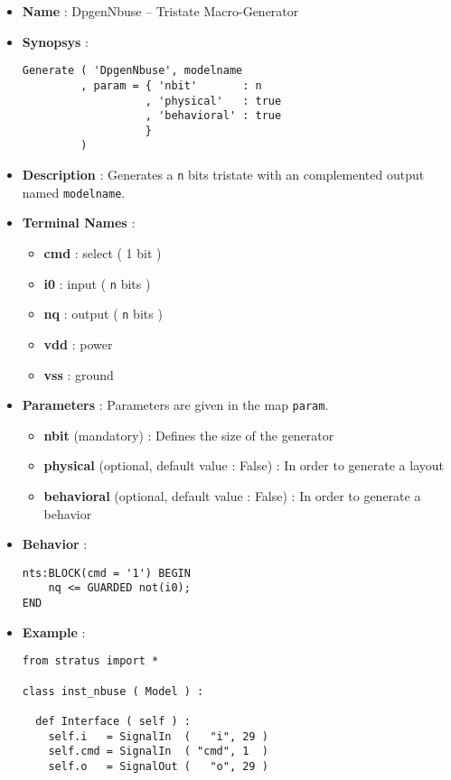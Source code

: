 \begin{itemize}
    \item \textbf{Name} : DpgenNbuse -- Tristate Macro-Generator
    \item \textbf{Synopsys} :
\begin{verbatim}
Generate ( 'DpgenNbuse', modelname
         , param = { 'nbit'       : n
                   , 'physical'   : true
                   , 'behavioral' : true         
                   }
         )
\end{verbatim}
    \item \textbf{Description} : Generates a \verb-n- bits tristate with an complemented output named \verb-modelname-.
    \item \textbf{Terminal Names} :
    \begin{itemize}
        \item \textbf{cmd} : select ( 1 bit )
        \item \textbf{i0} : input ( \verb-n- bits )
        \item \textbf{nq} : output ( \verb-n- bits )
        \item \textbf{vdd} : power
        \item \textbf{vss} : ground
    \end{itemize}
    \item \textbf{Parameters} : Parameters are given in the map \verb-param-.
    \begin{itemize}
        \item \textbf{nbit} (mandatory) : Defines the size of the generator
        \item \textbf{physical} (optional, default value : False) : In order to generate a layout
        \item \textbf{behavioral} (optional, default value : False) : In order to generate a behavior        
    \end{itemize}
    \item \textbf{Behavior} :
\begin{verbatim}
nts:BLOCK(cmd = '1') BEGIN
    nq <= GUARDED not(i0);
END
\end{verbatim}
    \item \textbf{Example} :
\begin{verbatim}
from stratus import *

class inst_nbuse ( Model ) :

  def Interface ( self ) :
    self.i   = SignalIn  (   "i", 29 )
    self.cmd = SignalIn  ( "cmd", 1  )
    self.o   = SignalOut (   "o", 29 )


\end{verbatim}
\end{itemize}
